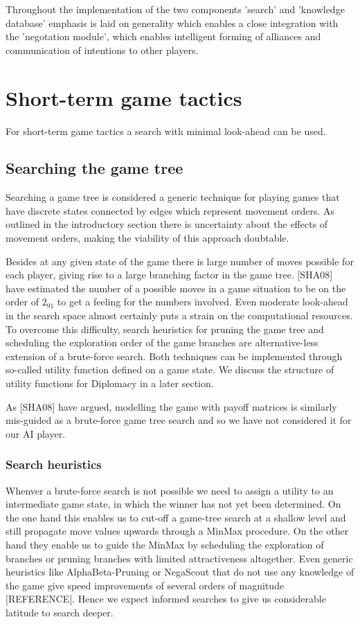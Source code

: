 \documentclass[12pt]{article}
\begin{document}
Throughout the implementation of the two components 'search' and 'knowledge
database' emphasis is laid on generality which enables a close integration
with the 'negotation module', which enables intelligent forming of 
alliances and communication of intentions to other players.

\section{Short-term game tactics}

For short-term game tactics a search with minimal look-ahead can be used.

\subsection{Searching the game tree}

Searching a game tree is considered a generic technique for playing 
games that have discrete states connected by edges which represent movement
orders. As outlined in the introductory section there is uncertainty about
the effects of movement orders, making the viability of this approach doubtable. 

Besides at any given state of the game there is large number of moves possible
for each player, giving rise to a large branching factor in the game tree. [SHA08]
have estimated the number of a possible moves in a game situation to be on the order
of $2_{91}$ to get a feeling for the numbers involved. Even moderate look-ahead in
the search space almost certainly puts a strain on the computational resources.
To overcome this difficulty, search heuristics for pruning the game tree and scheduling
the exploration order of the game branches are alternative-less extension of a
brute-force search. Both techniques can be implemented through so-called utility function
defined on a game state. We discuss the structure of utility functions for Diplomacy
in a later section.

As [SHA08] have argued, modelling the game with payoff matrices is similarly mis-guided
as a brute-force game tree search and so we have not considered it for our AI player.

\subsubsection{Search heuristics}

Whenver a brute-force search is not possible we need to assign a utility to an 
intermediate game state, in which the winner has not yet been determined. On the 
one hand this enables us to cut-off a game-tree search at a shallow level and
still propagate move values upwards through a MinMax procedure. On the other hand
they enable us to guide the MinMax by scheduling the exploration of branches or
pruning branches with limited attractiveness altogether. Even generic heuristics
like AlphaBeta-Pruning or NegaScout that do not use any knowledge of the game give
speed improvements of several orders of magnitude [REFERENCE]. Hence we expect
informed searches to give us considerable latitude to search deeper. 
\end{document}
